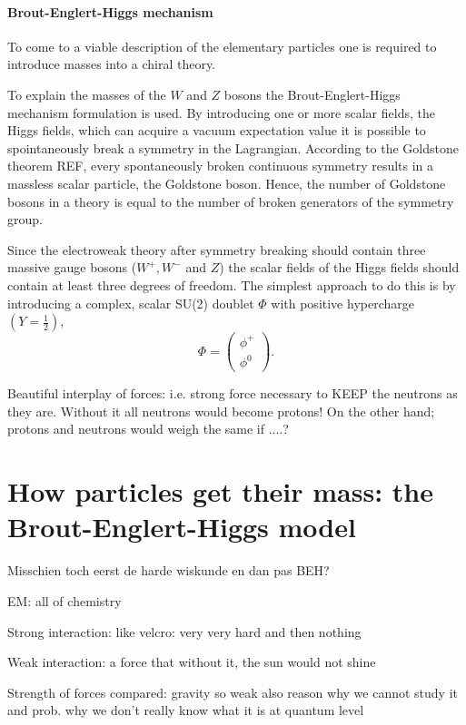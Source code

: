 \paragraph{Brout-Englert-Higgs mechanism}
To come to a viable description of the elementary particles one is required to introduce masses into a chiral theory.

To explain the masses of the $W$ and $Z$ bosons the Brout-Englert-Higgs mechanism formulation is used. By introducing one or more scalar fields, the Higgs fields, which can acquire a vacuum expectation value it is possible to spointaneously break a symmetry in the Lagrangian. According to the Goldstone theorem REF, every spontaneously broken continuous symmetry results in a massless scalar particle, the Goldstone boson. Hence, the number of Goldstone bosons in a theory is equal to the number of broken generators of the symmetry group.

Since the electroweak theory after symmetry breaking should contain three massive gauge bosons ($W^+, W^-$ and $Z$) the scalar fields of the Higgs fields should contain at least three degrees of freedom. The simplest approach to do this is by introducing a complex, scalar SU(2) doublet $\Phi$ with positive hypercharge $\left(Y=\frac{1}{2}\right)$,
\begin{equation}
\Phi = \begin{pmatrix} \phi^+ \\ \phi^0 \end{pmatrix}.
\end{equation}

Beautiful interplay of forces: i.e. strong force necessary to KEEP the neutrons as they are. Without it all neutrons would become protons! On the other hand; protons and neutrons would weigh the same if ....?

\section{How particles get their mass: the Brout-Englert-Higgs model}
Misschien toch eerst de harde wiskunde en dan pas BEH?

EM: all of chemistry

Strong interaction: like velcro: very very hard and then nothing

Weak interaction: a force that without it, the sun would not shine

Strength of forces compared: gravity so weak also reason why we cannot study it and prob. why we don't really know what it is at quantum level

